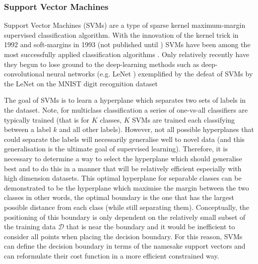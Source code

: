 \subsubsection{Support Vector Machines}

Support Vector Machines (SVMs) are a type of sparse kernel maximum-margin supervised classification algorithm.
With the innovation of the kernel trick in 1992 \citep{Boser1992} and soft-margins in 1993 (not published until \citep{Cortes1995}) SVMs have been 
among the most successfully applied classification algorithms \citep{Fernandez-Delgado2014}.
Only relatively recently have they begun to lose ground to the deep-learning methods such as deep-convolutional neural networks (e.g. LeNet \citep{LeCunn1998}) exemplified %
by the defeat of SVMs by the LeNet on the MNIST digit recognition dataset \citep{Hinton2006,Bengio2007} \citep{Bengio2013} %

The goal of SVMs is to learn a hyperplane which separates two sets of labels in the dataset. Note, for multiclass classification a series of one-vs-all
classifiers are typically trained (that is for \(K\) classes, \(K\) SVMs are trained each classifying between a label \(k\) and all other labels).
However, not all possible hyperplanes that could separate the labels will necessarily generalise well to novel data (and this generalisation
is the ultimate goal of supervised learning).  Therefore, it is necessary to determine a way to select the hyperplane which should generalise best and to do
this in a manner that will be relatively efficient especially with high dimension datasets.  This optimal hyperplane for separable classes can be demonstrated to be
the hyperplane which maximise the margin between the two classes \citep{vapnik1982estimation} in other words, the optimal boundary is the one that has the largest %
possible distance from each class (while still separating them).  Conceptually, the positioning of this boundary is only dependent
on the relatively small subset of the training data \(\mathcal{D}\) that is near the boundary and it would be inefficient to consider all points when
placing the decision boundary.  For this reason, SVMs can define the decision boundary in terms of the namesake support vectors and can reformulate
their cost function in a more efficient constrained way.

